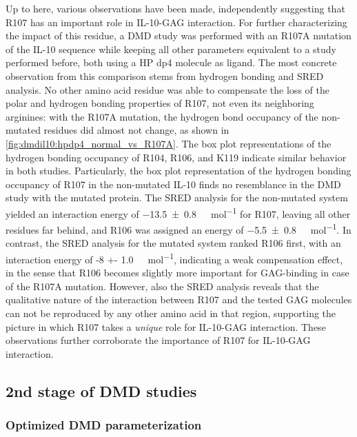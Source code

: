 Up to here, various observations have been made, independently suggesting that
R107 has an important role in IL-10-GAG interaction. For further characterizing
the impact of this residue, a DMD study was performed with an R107A mutation of
the IL-10 sequence while keeping all other parameters equivalent to a
study performed before, both using a HP dp4 molecule as ligand. The most
concrete observation from this comparison stems from hydrogen bonding and SRED
analysis. No other amino acid residue was able to compensate the loss of the
polar and hydrogen bonding properties of R107, not even its neighboring
arginines: with the R107A mutation, the hydrogen bond occupancy of the
non-mutated residues did almost not change, as shown in
\cref{fig:dmdil10:hpdp4_normal_vs_R107A}. The box plot representations of the
hydrogen bonding occupancy of R104, R106, and K119 indicate similar behavior in
both studies. Particularly, the box plot representation of the hydrogen bonding
occupancy of R107 in the non-mutated IL-10 finds no resemblance in the DMD study
with the mutated protein. The SRED analysis for the non-mutated system yielded
an interaction energy of \SI{-13.5 +- 0.8}{\kilo\calory\per\mol} for R107,
leaving all other residues far behind, and R106 was assigned an energy of
\SI{-5.5 +- 0.8}{\kilo\calory\per\mol}. In contrast, the SRED analysis for the
mutated system ranked R106 first, with an interaction energy of \SI{-8 +-
1.0}{\kilo\calory\per\mol}, indicating a weak compensation effect, in the sense
that R106 becomes slightly more important for GAG-binding in case of the R107A
mutation. However, also the SRED analysis reveals that the qualitative nature of
the interaction between R107 and the tested GAG molecules can not be reproduced
by any other amino acid in that region, supporting the picture in which R107
takes a \textit{unique} role for IL-10-GAG interaction. These observations
further corroborate the importance of R107 for IL-10-GAG interaction.


\subsection{2nd stage of DMD studies}


\subsubsection{Optimized DMD parameterization}
\label{dmdil10:method_setup_2nd}

